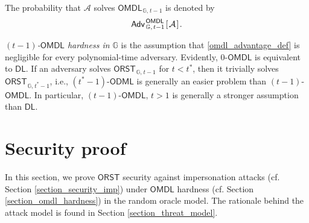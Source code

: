 \documentclass{iacrtrans}
\begin{document}
\noindent
The probability that $\mathcal{A}$
solves $\mathsf{OMDL}_{\hspace{1pt}\mathbb{G},\hspace{1pt}t-1}$
is denoted by
\vspace{5pt}
\begin{equation}\label{omdl_advantage_def}
\mathsf{Adv}
	_{\hspace{1pt}\mathbb{G},\hspace{1pt} t-1}
	^{\hspace{1pt}\mathsf{OMDL}}
	\hspace{1pt}
		[\hspace{1pt}
			\mathcal{A}
		\hspace{1pt}]\hspace{1pt}.
\vspace{5pt}
\end{equation}

\noindent
\textit{$(t-1)$-$\mathsf{OMDL}$ hardness in $\mathbb{G}$}
is the assumption that \eqref{omdl_advantage_def}
is negligible for every polynomial-time adversary.
Evidently, $0$-$\mathsf{OMDL}$
is equivalent to $\mathsf{DL}$.
If an adversary solves
$\mathsf{ORST}_{\hspace{1pt}\mathbb{G},\hspace{1pt} t-1}$
for $t < t^*$,
then it trivially solves
$\mathsf{ORST}_{\hspace{1pt}\mathbb{G},\hspace{1pt} t^*-1}$,
i.e., $(t^*-1)$-$\mathsf{ODML}$ is generally
an easier problem than $(t-1)$-$\mathsf{OMDL}$.
In particular,
$(t-1)$-$\mathsf{OMDL},\hspace{2pt} t > 1$
is generally a stronger assumption than
$\mathsf{DL}$.

\section{Security proof}\label{section_security_proof}

\noindent
In this section,
we prove $\mathsf{ORST}$ security against
impersonation attacks (cf. Section \ref{section_security_imp})
under $\mathsf{OMDL}$ hardness
(cf. Section \ref{section_omdl_hardness})
in the random oracle model.
The rationale behind the attack model
is found in Section \ref{section_threat_model}.
\end{document}

